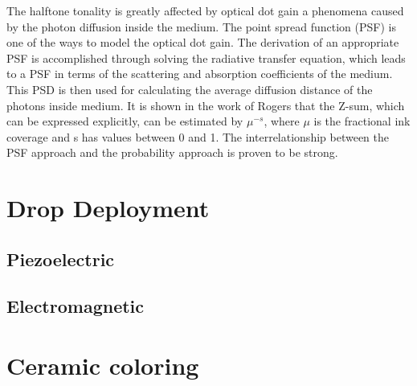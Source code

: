 The halftone tonality is greatly affected by optical dot gain a phenomena caused by the photon diffusion inside the medium. The point spread function (PSF) is one of the ways to model the optical dot gain. The derivation of an appropriate PSF is accomplished through solving the radiative transfer equation, which leads to a PSF in terms of the scattering and absorption coefficients of the medium. This PSD is then used for calculating the average diffusion distance of the photons inside medium. It is shown in the work of Rogers that the Z-sum, which can be expressed explicitly, can be estimated by $\mu^{-s}$, where $\mu$ is the fractional ink coverage and s has values between 0 and 1.  The interrelationship  between the PSF  approach and the probability approach is proven to be strong. \citep{rogers2015point}
\section{Drop Deployment}


\subsection{Piezoelectric}


\subsection{Electromagnetic}
\label{sec:freiheitsgrad_eines_getriebes}


\section{Ceramic coloring}
\label{sec:grundlagen_für_die_kinematischen_betrachtungen}


